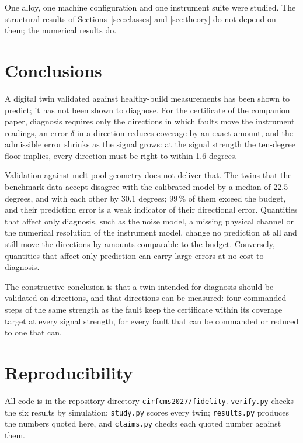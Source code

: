 \documentclass[preprint,12pt]{elsarticle}
\begin{document}
One alloy, one machine configuration and one instrument suite were studied. The
structural results of Sections~\ref{sec:classes} and \ref{sec:theory} do not
depend on them; the numerical results do.

\section{Conclusions}
\label{sec:conclusions}

A digital twin validated against healthy-build measurements has been shown to
predict; it has not been shown to diagnose. For the certificate of the companion
paper, diagnosis requires only the directions in which faults move the
instrument readings, an error $\delta$ in a direction reduces coverage by an
exact amount, and the admissible error shrinks as the signal grows: at the
signal strength the ten-degree floor implies, every direction must be right to
within 1.6 degrees.

Validation against melt-pool geometry does not deliver that. The twins that the
benchmark data accept disagree with the calibrated model by a median of
22.5 degrees, and with each other by 30.1 degrees; 99\,\%
of them exceed the budget, and their prediction error is a weak indicator of
their directional error. Quantities that affect only diagnosis, such as the
noise model, a missing physical channel or the numerical resolution of the
instrument model, change no prediction at all and still move the directions by
amounts comparable to the budget. Conversely, quantities that affect only
prediction can carry large errors at no cost to diagnosis.

The constructive conclusion is that a twin intended for diagnosis should be
validated on directions, and that directions can be measured: four commanded
steps of the same strength as the fault keep the certificate within its coverage
target at every signal strength, for every fault that can be commanded or
reduced to one that can.

\section*{Reproducibility}
All code is in the repository directory \texttt{cirfcms2027/fidelity}.
\texttt{verify.py} checks the six results by simulation; \texttt{study.py}
scores every twin; \texttt{results.py} produces the numbers quoted here, and
\texttt{claims.py} checks each quoted number against them.
\end{document}
